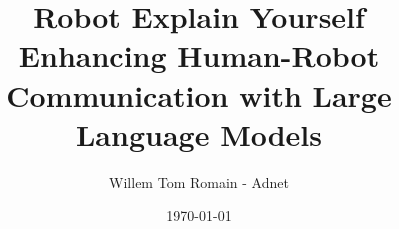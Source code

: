 \documentclass[11pt,a4paper]{article}
\begin{document}
\title{Robot Explain Yourself\\
Enhancing Human-Robot Communication with Large Language Models}
\author{Willem Tom Romain - Adnet}
\date{\today}
\maketitle



\tableofcontents
\newpage












\end{document}
